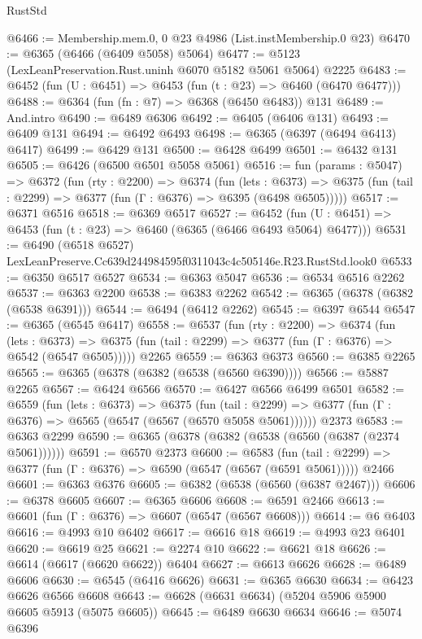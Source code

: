 \begin{lexlean}{RustStd}
\begin{coremodule}
@6466 := Membership.mem.{0, 0} @23 @4986 (List.instMembership.{0} @23)
@6470 := @6365 (@6466 (@6409 @5058) @5064)
@6477 := @5123 (LexLeanPreservation.Rust.uninh @6070 @5182 @5061 @5064) @2225
@6483 := @6452 (fun (U : @6451) => @6453 (fun (t : @23) => @6460 (@6470 @6477)))
@6488 := @6364 (fun (fn : @7) => @6368 (@6450 @6483)) @131
@6489 := And.intro
@6490 := @6489 @6306
@6492 := @6405 (@6406 @131)
@6493 := @6409 @131
@6494 := @6492 @6493
@6498 := @6365 (@6397 (@6494 @6413) @6417)
@6499 := @6429 @131
@6500 := @6428 @6499
@6501 := @6432 @131
@6505 := @6426 (@6500 @6501 @5058 @5061)
@6516 := fun (params : @5047) =>
  @6372
    (fun (rty : @2200) =>
    @6374
      (fun (lets : @6373) =>
      @6375 (fun (tail : @2299) => @6377 (fun (Γ : @6376) => @6395 (@6498 @6505)))))
@6517 := @6371 @6516
@6518 := @6369 @6517
@6527 := @6452 (fun (U : @6451) => @6453 (fun (t : @23) => @6460 (@6365 (@6466 @6493 @5064) @6477)))
@6531 := @6490 (@6518 @6527) LexLeanPreserve.Cc639d244984595f0311043c4c505146e.R23.RustStd.look0
@6533 := @6350 @6517 @6527
@6534 := @6363 @5047
@6536 := @6534 @6516 @2262
@6537 := @6363 @2200
@6538 := @6383 @2262
@6542 := @6365 (@6378 (@6382 (@6538 @6391)))
@6544 := @6494 (@6412 @2262)
@6545 := @6397 @6544
@6547 := @6365 (@6545 @6417)
@6558 := @6537
    (fun (rty : @2200) =>
    @6374
      (fun (lets : @6373) =>
      @6375 (fun (tail : @2299) => @6377 (fun (Γ : @6376) => @6542 (@6547 @6505)))))
    @2265
@6559 := @6363 @6373
@6560 := @6385 @2265
@6565 := @6365 (@6378 (@6382 (@6538 (@6560 @6390))))
@6566 := @5887 @2265
@6567 := @6424 @6566
@6570 := @6427 @6566 @6499 @6501
@6582 := @6559
    (fun (lets : @6373) =>
    @6375
      (fun (tail : @2299) => @6377 (fun (Γ : @6376) => @6565 (@6547 (@6567 (@6570 @5058 @5061))))))
    @2373
@6583 := @6363 @2299
@6590 := @6365 (@6378 (@6382 (@6538 (@6560 (@6387 (@2374 @5061))))))
@6591 := @6570 @2373
@6600 := @6583
    (fun (tail : @2299) => @6377 (fun (Γ : @6376) => @6590 (@6547 (@6567 (@6591 @5061)))))
    @2466
@6601 := @6363 @6376
@6605 := @6382 (@6538 (@6560 (@6387 @2467)))
@6606 := @6378 @6605
@6607 := @6365 @6606
@6608 := @6591 @2466
@6613 := @6601 (fun (Γ : @6376) => @6607 (@6547 (@6567 @6608)))
@6614 := @6 @6403
@6616 := @4993 @10 @6402
@6617 := @6616 @18
@6619 := @4993 @23 @6401
@6620 := @6619 @25
@6621 := @2274 @10
@6622 := @6621 @18
@6626 := @6614 (@6617 (@6620 @6622)) @6404
@6627 := @6613 @6626
@6628 := @6489 @6606
@6630 := @6545 (@6416 @6626)
@6631 := @6365 @6630
@6634 := @6423 @6626 @6566 @6608
@6643 := @6628 (@6631 @6634) (@5204 @5906 @5900 @6605 @5913 (@5075 @6605))
@6645 := @6489 @6630 @6634
@6646 := @5074 @6396

\end{coremodule}
\end{lexlean}
